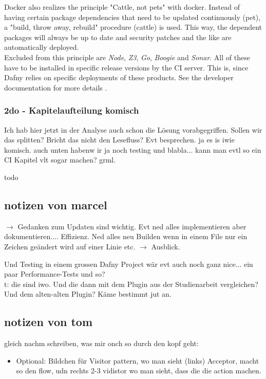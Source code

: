 Docker also realizes the principle "Cattle, not pets" with docker.  
Instead of having certain package dependencies that need to be updated continuously (pet), a "build, throw away, rebuild" procedure (cattle) is used.
This way, the dependent packages will always be up to date and security patches and the like are automatically deployed.\\

Excluded from this principle are \textit{Node}, \textit{Z3}, \textit{Go}, \textit{Boogie} and \textit{Sonar}.
All of these have to be installed in specific release versions by the CI server.
This is, since Dafny relies on specific deployments of these products.
See the developer documentation for more details \cite{dev}.\\

\subsubsection{2do - Kapitelaufteilung komisch}
Ich hab hier jetzt in der Analyse auch schon die Lösung vorabgegriffen. Sollen wir das splitten? Bricht das nicht den Lesefluss? Evt besprechen.
ja es is iwie komisch. auch unten habenw ir ja noch testing und blabla... kann man evtl so ein CI Kapitel vlt sogar machen? grml.

todo


\subsection{notizen von marcel}

$\rightarrow$ Gedanken zum Updaten sind wichtig. Evt ned alles implementieren aber dokumentieren.... Effizienz. Ned alles neu Builden
wenn in einem File nur ein Zeichen geändert wird auf einer Linie etc. $\rightarrow$ Ausblick.

Und Testing in einem grossen Dafny Project wär evt auch noch ganz nice... ein paar Performance-Tests und so?  \\t: die sind iwo.
Und die dann mit dem Plugin aus der Studienarbeit vergleichen? Und dem alten-alten Plugin? Käme bestimmt jut an.


\subsection{notizen von tom}
gleich nachm schreiben, was mir onch so durch den kopf geht:
\begin{itemize}
    \item Optional: Bildchen für Visitor pattern, wo man sieht (links) Acceptor, macht so den flow, udn rechts 2-3 vidistor wo man sieht, dass die die action machen.
\end{itemize}
